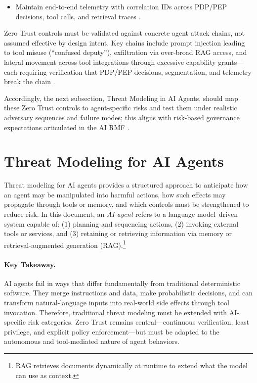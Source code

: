 \begin{TNtwocol}
\begin{itemize}
            \item Maintain end-to-end telemetry with correlation IDs across PDP/PEP decisions, tool calls, and retrieval traces \cite{CIS_Controls_v8_1}.
      \end{itemize}

      Zero Trust controls must be validated against concrete agent attack chains, not assumed effective by design intent. Key chains include prompt injection leading to tool misuse (``confused deputy''), exfiltration via over-broad RAG access, and lateral movement across tool integrations through excessive capability grants---each requiring verification that PDP/PEP decisions, segmentation, and telemetry break the chain \cite{OWASP_LLM_Top10,NIST_SP800_207}.

      Accordingly, the next subsection, Threat Modeling in AI Agents, should map these Zero Trust controls to agent-specific risks and test them under realistic adversary sequences and failure modes; this aligns with risk-based governance expectations articulated in the AI RMF \cite{NIST_AI_RMF_100_1,NIST_SP800_207}.


      \section{Threat Modeling for AI Agents}

      Threat modeling for AI agents provides a structured approach to anticipate how an agent may be manipulated into harmful actions, how such effects may propagate through tools or memory, and which controls must be strengthened to reduce risk. In this document, an \emph{AI agent} refers to a language-model–driven system capable of:
      (1) planning and sequencing actions,
      (2) invoking external tools or services, and
      (3) retaining or retrieving information via memory or retrieval-augmented generation (RAG).\footnote{RAG retrieves documents dynamically at runtime to extend what the model can use as context.\cite{NIST_GenAI_Profile_600_1}}

      \paragraph{Key Takeaway.}
      AI agents fail in ways that differ fundamentally from traditional deterministic software. They merge instructions and data, make probabilistic decisions, and can transform natural-language inputs into real-world side effects through tool invocation.\cite{NIST_AI_RMF_100_1,MITRE_ATLAS}
      Therefore, traditional threat modeling must be extended with AI-specific risk categories.
      Zero Trust remains central—continuous verification, least privilege, and explicit policy enforcement—but must be adapted to the autonomous and tool-mediated nature of agent behaviors.\cite{NIST_SP800_207,CISA_ZTMM_v2}


\end{TNtwocol}
